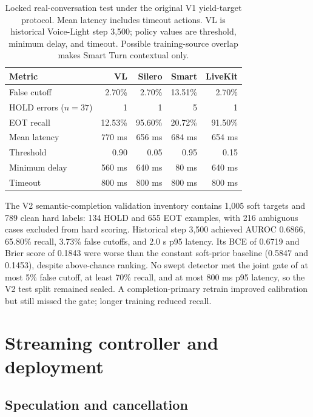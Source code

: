 \documentclass[10pt,twocolumn]{article}
\begin{document}
\begin{table}[H]
\centering
\caption{Locked real-conversation test under the original V1 yield-target protocol. Mean latency
includes timeout actions. VL is historical Voice-Light step 3,500; policy values are threshold,
minimum delay, and timeout. Possible training-source overlap makes Smart Turn contextual only.}
\scriptsize
\setlength{\tabcolsep}{3.2pt}
\begin{tabularx}{\columnwidth}{Xrrrr}
\toprule
Metric & VL & Silero & Smart & LiveKit \\
\midrule
False cutoff & 2.70\% & 2.70\% & 13.51\% & 2.70\% \\
HOLD errors ($n=37$) & 1 & 1 & 5 & 1 \\
EOT recall & 12.53\% & 95.60\% & 20.72\% & 91.50\% \\
Mean latency & 770 ms & 656 ms & 684 ms & 654 ms \\
Threshold & 0.90 & 0.05 & 0.95 & 0.15 \\
Minimum delay & 560 ms & 640 ms & 80 ms & 640 ms \\
Timeout & 800 ms & 800 ms & 800 ms & 800 ms \\
\bottomrule
\end{tabularx}
\label{tab:v1}
\end{table}

The V2 semantic-completion validation inventory contains 1,005 soft targets and 789 clean hard
labels: 134 HOLD and 655 EOT examples, with 216 ambiguous cases excluded from hard scoring.
Historical step 3,500 achieved AUROC 0.6866, 65.80\% recall, 3.73\% false cutoffs, and 2.0 s p95
latency. Its BCE of 0.6719 and Brier score of 0.1843 were worse than the constant soft-prior
baseline (0.5847 and 0.1453), despite above-chance ranking. No swept detector met the joint gate of
at most 5\% false cutoff, at least 70\% recall, and at most 800 ms p95 latency, so the V2 test split
remained sealed. A completion-primary retrain improved calibration but still missed the gate;
longer training reduced recall.

\section{Streaming controller and deployment}

\subsection{Speculation and cancellation}
\end{document}
